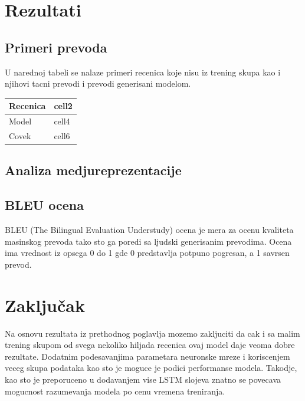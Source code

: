 \documentclass[a4paper]{article}
\begin{document}
\section{Rezultati}

\subsection{Primeri prevoda}

U narednoj tabeli se nalaze primeri recenica koje nisu iz trening skupa kao i njihovi tacni prevodi i prevodi generisani modelom.

\begin{center}
  \begin{tabular}{ |l|l| } 
    \hline
    Recenica & cell2 \\
    \hline
    Model & cell4 \\
    \hline
    Covek & cell6 \\
    \hline
  \end{tabular}
\end{center}

\subsection{Analiza medjureprezentacije}

\subsection{BLEU ocena}

BLEU (The Bilingual Evaluation Understudy) ocena je mera za ocenu kvaliteta masinskog prevoda tako sto ga poredi sa ljudski generisanim prevodima. Ocena ima vrednost iz opsega 0 do 1 gde 0 predstavlja potpuno pogresan, a 1 savrsen prevod.

\section{Zaključak}

Na osnovu rezultata iz prethodnog poglavlja mozemo zakljuciti da cak i sa malim trening skupom od svega nekoliko hiljada recenica ovaj model daje veoma dobre rezultate. Dodatnim podesavanjima parametara neuronske mreze i koriscenjem veceg skupa podataka kao sto je \cite{wmt14} moguce je podici performanse modela. Takodje, kao sto je preporuceno u \cite{sutskever2014sequence} dodavanjem vise LSTM slojeva znatno se povecava mogucnost razumevanja modela po cenu vremena treniranja.

\medskip

\printbibliography
\end{document}
